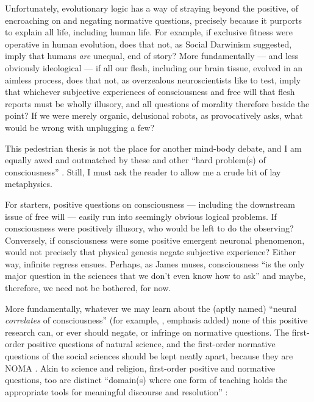 Unfortunately, evolutionary logic has a way of straying beyond the positive, of encroaching on and negating normative questions, precisely because it purports to explain all life, including human life.
For example, if exclusive fitness were operative in human evolution, does that not, as Social Darwinism suggested, imply that humans \emph{are} unequal, end of story?
More fundamentally --- and less obviously ideological --- if all our flesh, including our brain tissue, evolved in an aimless process, does that not, as overzealous neuroscientists like to test, imply that whichever subjective experiences of consciousness and free will that flesh reports must be wholly illusory, and all questions of morality therefore beside the point?
If we were merely organic, delusional robots, as \citet[Chapter 23]{Wright2000} provocatively asks, what would be wrong with unplugging a few?

This pedestrian thesis is not the place for another mind-body debate, and I am equally awed and outmatched by these and other ``hard problem(s) of consciousness''  \citep{Chalmers1995}.
Still, I must ask the reader to allow me a crude bit of lay metaphysics.

For starters, positive questions on consciousness --- including the downstream issue of free will --- easily run into seemingly obvious logical problems.
If consciousness were positively illusory, who would be left to do the observing?
Conversely, if consciousness were some positive emergent neuronal phenomenon, would not precisely that physical genesis negate subjective experience?
Either way, infinite regress ensues.
Perhaps, as James \citeauthor{Trefil1997} muses, consciousness ``is the only major question in the sciences that we don't even know how to ask'' \citeyearpar[15]{Trefil1997} and maybe, therefore, we need not be bothered, for now.

More fundamentally, whatever we may learn about the (aptly named) ``neural \emph{correlates} of consciousness'' (for example, \citealt{Koch2004}, emphasis added) none of this positive research can, or ever should negate, or infringe on normative questions.
The first-order positive questions of natural science, and the first-order normative questions of the social sciences should be kept neatly apart, because they are \gls{NOMA} \citep{Gould1997}.
Akin to science and religion, first-order positive and normative questions, too are distinct ``domain(s) where one form of teaching holds the appropriate tools for meaningful discourse and resolution'' \citep[3]{Gould2002}:

